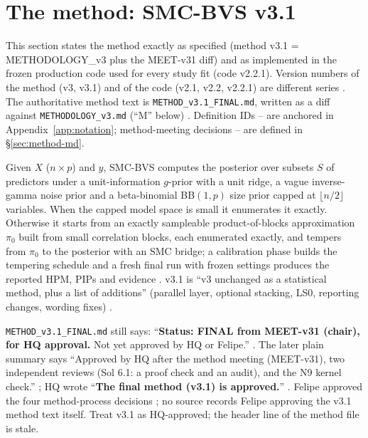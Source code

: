 \section{The method: SMC-BVS v3.1}\label{sec:method}

This section states the method exactly as specified (method v3.1 = METHODOLOGY\_v3 plus the MEET-v31 diff) and as
implemented in the frozen production code used for every study fit (code v2.2.1). Version numbers of the method
(v3, v3.1) and of the code (v2.1, v2.2, v2.2.1) are different series
. The authoritative method text is \texttt{METHOD\_v3.1\_FINAL.md}, written as a diff against
\texttt{METHODOLOGY\_v3.md} (``M'' below) . Definition IDs
-- are anchored in Appendix~\ref{app:notation}; method-meeting decisions -- are
defined in \S\ref{sec:method-md}.

\begin{plain}
Given $X$ ($n\times p$) and $y$, SMC-BVS computes the posterior over subsets $S$ of predictors under a unit-information
$g$-prior with a unit ridge, a vague inverse-gamma noise prior and a beta-binomial BB$(1,p)$ size prior capped at
$\lfloor n/2\rfloor$ variables. When the capped model space is small it enumerates it exactly. Otherwise it starts from an
exactly sampleable product-of-blocks approximation $\pi_0$ built from small correlation blocks, each enumerated exactly,
and tempers from $\pi_0$ to the posterior with an SMC bridge; a calibration phase builds the tempering schedule and a
fresh final run with frozen settings produces the reported HPM, PIPs and evidence .
v3.1 is ``v3 unchanged as a statistical method, plus a list of additions'' (parallel layer, optional stacking, LS0,
reporting changes, wording fixes) .
\end{plain}

\begin{uncertain}
\texttt{METHOD\_v3.1\_FINAL.md} still says: ``\textbf{Status: FINAL from MEET-v31 (chair), for HQ approval.} Not yet approved
by HQ or Felipe.'' . The later plain summary says ``Approved by HQ
after the method meeting (MEET-v31), two independent reviews (Sol 6.1: a proof check and an audit), and the N9 kernel
check.'' ; HQ wrote ``\textbf{The final method (v3.1) is
approved.}'' . Felipe approved the four method-process decisions 
; no source records Felipe approving the v3.1 method text itself. Treat v3.1 as HQ-approved;
the header line of the method file is stale.
\end{uncertain}

